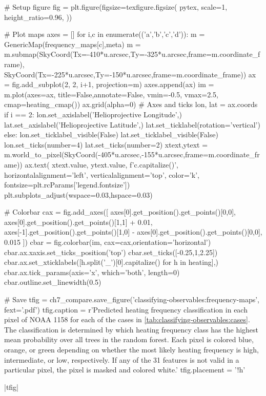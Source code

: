 \begin{pycode}
# Setup figure
fig = plt.figure(figsize=texfigure.figsize(
    pytex,
    scale=1,
    height_ratio=0.96,
))

# Plot maps
axes = []
for i,c in enumerate(('a','b','c','d')):
    m = GenericMap(frequency_maps[c],meta)
    m = m.submap(SkyCoord(Tx=-410*u.arcsec,Ty=-325*u.arcsec,frame=m.coordinate_frame),
                 SkyCoord(Tx=-225*u.arcsec,Ty=-150*u.arcsec,frame=m.coordinate_frame))
    ax = fig.add_subplot(2, 2, i+1, projection=m)
    axes.append(ax)
    im = m.plot(axes=ax, title=False,annotate=False, vmin=-0.5, vmax=2.5, cmap=heating_cmap())
    ax.grid(alpha=0)
    # Axes and ticks
    lon, lat = ax.coords
    if i == 2:
        lon.set_axislabel('Helioprojective Longitude',)
        lat.set_axislabel('Helioprojective Latitude',)
        lat.set_ticklabel(rotation='vertical')
    else:
        lon.set_ticklabel_visible(False)
        lat.set_ticklabel_visible(False)
    lon.set_ticks(number=4)
    lat.set_ticks(number=2)
    xtext,ytext = m.world_to_pixel(SkyCoord(-405*u.arcsec,-155*u.arcsec,frame=m.coordinate_frame))
    ax.text(
        xtext.value, ytext.value,
        f'{c.capitalize()}',
        horizontalalignment='left',
        verticalalignment='top',
        color='k', fontsize=plt.rcParams['legend.fontsize'])
plt.subplots_adjust(wspace=0.03,hspace=0.03)

# Colorbar
cax = fig.add_axes([
    axes[0].get_position().get_points()[0,0],
    axes[0].get_position().get_points()[1,1] + 0.01,
    axes[-1].get_position().get_points()[1,0] - axes[0].get_position().get_points()[0,0],
    0.015
])
cbar = fig.colorbar(im, cax=cax,orientation='horizontal')
cbar.ax.xaxis.set_ticks_position('top')
cbar.set_ticks([-0.25,1,2.25])
cbar.ax.set_xticklabels([h.split('_')[0].capitalize() for h in heating],)
cbar.ax.tick_params(axis='x', which='both', length=0)
cbar.outline.set_linewidth(0.5)

# Save
tfig = ch7_compare.save_figure('classifying-observables:frequency-maps', fext='.pdf')
tfig.caption = r'Predicted heating frequency classification in each pixel of NOAA 1158 for each of the cases in \autoref{tab:classifying-observables:cases}. The classification is determined by which heating frequency class has the highest mean probability over all trees in the random forest. Each pixel is colored blue, orange, or green depending on whether the most likely heating frequency is high, intermediate, or low, respectively. If any of the 31 features is not valid in a particular pixel, the pixel is masked and colored white.'
tfig.placement = '!h'
\end{pycode}
|tfig|

